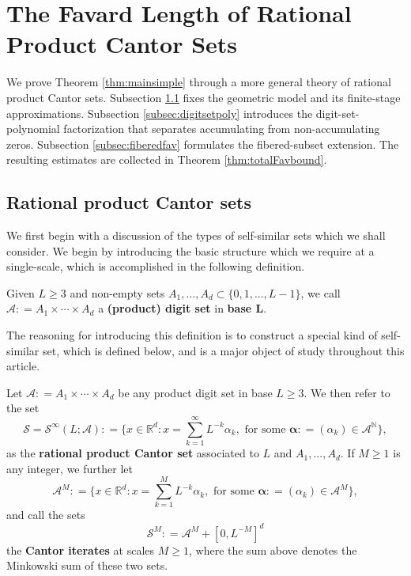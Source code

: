 \documentclass[12pt]{amsart}
\numberwithin{equation}{section}
\begin{document}
\section{The Favard Length of Rational Product Cantor Sets}\label{sec:RPCSfavresults}

We prove Theorem \ref{thm:mainsimple} through a more general theory of rational product Cantor sets.  Subsection \ref{subsec:RPCS} fixes the geometric model and its finite-stage approximations.  Subsection \ref{subsec:digitsetpoly} introduces the digit-set-polynomial factorization that separates accumulating from non-accumulating zeros.  Subsection \ref{subsec:fiberedfav} formulates the fibered-subset extension.  The resulting estimates are collected in Theorem \ref{thm:totalFavbound}.

\subsection{Rational product Cantor sets}\label{subsec:RPCS}
We first begin with a discussion of the types of self-similar sets which we shall consider. We begin by introducing the basic structure which we require at a single-scale, which is accomplished in the following definition.

\medskip

\begin{definition}
Given $L \geq 3$ and non-empty sets $A_1,...,A_d \subset \{0,1,...,L-1\}$, we call $\mathcal{A} : = A_1 \times \cdots \times A_d$ a \textbf{(product) digit set} in \textbf{base $\bm{L}$}.
\end{definition}

The reasoning for introducing this definition is to construct a special kind of self-similar set, which is defined below, and is a major object of study throughout this article.

\medskip

\begin{definition}
Let $\mathcal{A} : = A_1 \times \cdots \times A_d$ be any product digit set in base $L \geq 3$. We then refer to the set
$$
\mathcal{S} = \mathcal{S}^{\infty}(L; \mathcal{A}) : = \big\{x \in \mathbb{R}^d : x = \sum\limits_{k=1}^{\infty} L^{-k} \alpha_k, \textrm{ for some } \bm{\alpha} : = (\alpha_k) \in \mathcal{A}^{\mathbb{N}} \big\},
$$
as the \textbf{rational product Cantor set} associated to $L$ and $A_1,...,A_d$. If $M \geq 1$ is any integer, we further let
$$
\mathcal{A}^M : = \big\{x \in \mathbb{R}^d : x = \sum\limits_{k=1}^{M} L^{-k} \alpha_k, \textrm{ for some } \bm{\alpha} : = (\alpha_k) \in \mathcal{A}^{M} \big\},
$$
and call the sets
$$
\mathcal{S}^M : = \mathcal{A}^M + [0,L^{-M}]^d
$$
the \textbf{Cantor iterates} at scales $M \geq 1$, where the sum above denotes the Minkowski sum of these two sets.
\end{definition}
\end{document}
